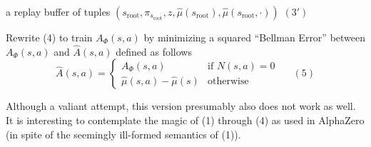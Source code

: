 \documentclass{article}
\begin{document}
\medskip
\centerline{a replay buffer of tuples $(s_{\mathrm{root}},\pi_{s_{\mathrm{root}}},z,\hat{\mu}(s_{\mathrm{root}}),\hat{\mu}(s_{\mathrm{root}},\cdot))$ \hspace{2em}$(3')$}

\medskip
Rewrite (4) to train $A_\Phi(s,a)$ by minimizing a squared ``Bellman Error'' between $A_\Phi(s,a)$ and $\hat{A}(s,a)$ defined as follows
$$\hat{A}(s,a) =  \left\{\begin{array}{ll}A_\Phi(s,a) &\mbox{if $N(s,a) = 0$} \\ \hat{\mu}(s,a) - \hat{\mu}(s) & \mbox{otherwise} \end{array}\right.\;\;\;\;\;(5)$$

\medskip
Although a valiant attempt, this version presumably also does not work as well.
It is interesting to contemplate the magic of (1) through (4) as used in AlphaZero (in spite of the seemingly ill-formed semantics of (1)).
\end{document}
